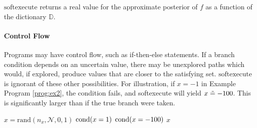 $\textrm{softexecute}$ returns a real value for the approximate posterior of $f$ as a function of the dictionary $\mathbb{D}$.

\paragraph{Control Flow}
Programs may have control flow, such as if-then-else statements.
If a branch condition depends on an uncertain value, there may be unexplored paths which would, if explored, produce values that are closer to the satisfying set.
$\textrm{softexecute}$ is ignorant of these other possibilities.
For illustration, if $x = -1$ in Example Program \ref{prog:ex2},
 the condition fails, and \textrm{softexecute} will yield $x \mathrel{\tilde{=}} -100$. This is significantly larger than if the true branch were taken.



\begin{exprogram}[tb]
\caption{}
\label{prog:ex2}
\begin{algorithmic}
\STATE $x = \textrm{rand}(n_x, \mathcal{N}, 0, 1)$
\STATE $\operatorname{cond}(x = 1)$
\ELSE
\STATE $\operatorname{cond}(x = -100)$
\ENDIF
{} $x$
\end{algorithmic}
\end{exprogram}



